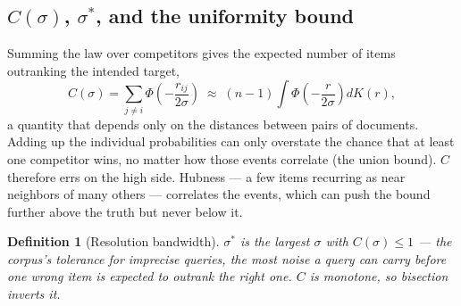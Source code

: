 \documentclass[11pt,letterpaper]{article}
\newtheorem{definition}{Definition}
\newcommand{\sstar}{\sigma^{*}}
\begin{document}
\subsection{$C(\sigma)$, $\sstar$, and the uniformity bound}

Summing the law over competitors gives the expected number of items
outranking the intended target,
\[
C(\sigma) = \sum_{j \ne i} \Phi\!\left(-\frac{r_{ij}}{2\sigma}\right)
\;\approx\; (n{-}1)\!\int \Phi\!\left(-\frac{r}{2\sigma}\right) dK(r),
\]
a quantity that depends only on the distances between pairs of
documents. Adding up the individual probabilities can only overstate the
chance that at least one competitor wins, no matter how those events
correlate (the union bound). $C$ therefore errs on the high side.
Hubness --- a few items recurring as near neighbors of many others ---
correlates the events, which can push the bound further above the truth
but never below it.

\begin{definition}[Resolution bandwidth]
$\sstar$ is the largest $\sigma$ with $C(\sigma) \le 1$ --- the corpus's
tolerance for imprecise queries, the most noise a query can carry before
one wrong item is expected to outrank the right one. $C$ is monotone, so
bisection inverts it.
\end{definition}
\end{document}
